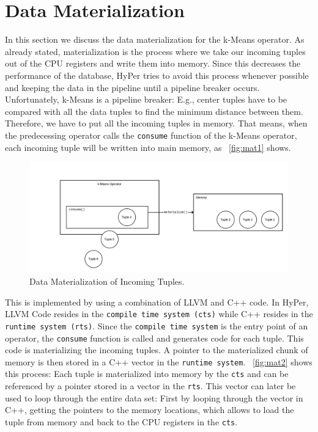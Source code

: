 \section{Data Materialization}

In this section we discuss the data materialization for the k-Means operator. As already stated, materialization is the process where we take our incoming tuples out of the CPU registers and write them into memory. Since this decreases the performance of the database, HyPer tries to avoid this process whenever possible and keeping the data in the pipeline until a pipeline breaker occurs. Unfortunately, k-Means is a pipeline breaker: E.g., center tuples have to be compared with all the data tuples to find the minimum distance between them. Therefore, we have to put all the incoming tuples in memory. That means, when the predecessing operator calls the \texttt{consume} function of the k-Means operator, each incoming tuple will be written into main memory, as ~\autoref{fig:mat1} shows. 

\begin{figure}[htsb]
  \centering
  \includegraphics[scale=0.4]{figures/mat1}
  \caption[Data Materialization of Incoming Tuples]{Data Materialization of Incoming Tuples.}
  \label{fig:mat1}
\end{figure}

This is implemented by using a combination of LLVM and C++ code. In HyPer, LLVM Code resides in the \texttt{compile time system (cts)} while C++ resides in the \texttt{runtime system (rts)}. Since the \texttt{compile time system} is the entry point of an operator, the \texttt{consume} function is called and generates code for each tuple. This code is materializing the incoming tuples. A pointer to the materialized chunk of memory is then stored in a C++ vector in the \texttt{runtime system}. ~\autoref{fig:mat2} shows this process: Each tuple is materialized into memory by the \texttt{cts} and can be referenced by a pointer stored in a vector in the \texttt{rts}. This vector can later be used to loop through the entire data set: First by looping through the vector in C++, getting the pointers to the memory locations, which allows to load the tuple from memory and back to the CPU registers in the \texttt{cts}. 


